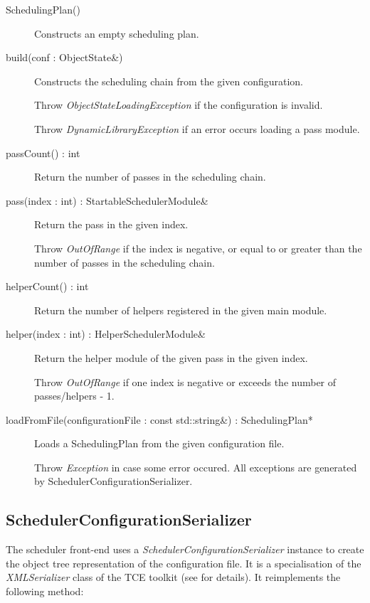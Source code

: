 \documentclass[a4paper,twoside]{tce}
\begin{document}
\begin{description}

\item[SchedulingPlan()]
  Constructs an empty scheduling plan.

\item[build(conf : ObjectState\&)]
  Constructs the scheduling chain from the given configuration.

  Throw \emph{ObjectStateLoadingException} if the configuration is
  invalid.

  Throw \emph{DynamicLibraryException} if an error occurs loading a
  pass module.

\item[passCount() : int]
  Return the number of passes in the scheduling chain.

\item[pass(index : int) : StartableSchedulerModule\&]
  Return the pass in the given index.

  Throw \emph{OutOfRange} if the index is negative, or equal to or
  greater than the number of passes in the scheduling chain.

\item[helperCount() : int]
  Return the number of helpers registered in the given main module.

\item[helper(index : int) : HelperSchedulerModule\&]
  Return the helper module of the given pass in the given index.

  Throw \emph{OutOfRange} if one index is negative or exceeds the
  number of passes/helpers - 1.

\item[loadFromFile(configurationFile : const std::string\&) :
  SchedulingPlan*]
  Loads a SchedulingPlan from the given configuration file.

  Throw \emph{Exception} in case some error occured. All exceptions
  are generated by SchedulerConfigurationSerializer.
\end{description}

\subsection{SchedulerConfigurationSerializer}

The scheduler front-end uses a \emph{SchedulerConfigurationSerializer}
instance to create the object tree representation of the configuration
file. It is a specialisation of the \emph{XMLSerializer} class of the
TCE toolkit (see \cite{ToolkitDesign} for details). It reimplements the
following method:
\end{document}
